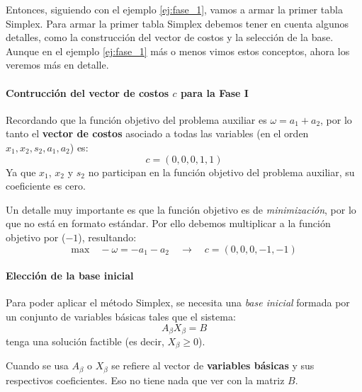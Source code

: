 Entonces, siguiendo con el ejemplo \ref{ej:fase_1}, vamos a armar la primer tabla Simplex. Para armar la primer tabla Simplex debemos tener en cuenta algunos detalles, como la construcción del vector de costos y la selección de la base. Aunque en el ejemplo \ref{ej:fase_1} más o menos vimos estos conceptos, ahora los veremos más en detalle.

\paragraph{Contrucción del vector de costos \(c\) para la Fase I}

Recordando que la función objetivo del problema auxiliar es \(\omega = a_1 + a_2\), por lo tanto el \textbf{vector de costos} asociado a todas las variables (en el orden \(x_1, x_2, s_2, a_1, a_2\)) es: 
\[c = (0, 0, 0, 1, 1)\]
Ya que \(x_1\), \(x_2\) y \(s_2\) no participan en la función objetivo del problema auxiliar, su coeficiente es cero.

Un detalle muy importante es que la función objetivo es de \textit{minimización}, por lo que no está en formato estándar. Por ello debemos multiplicar a la función objetivo por (\(-1\)), resultando:
\[
  \text{max} \quad -\omega = - a_1 - a_2 \quad \rightarrow \quad c=(0,0,0,-1,-1)
\]

\paragraph{Elección de la base inicial}

Para poder aplicar el método Simplex, se necesita una \textit{base inicial} formada por un conjunto de variables básicas tales que el sistema:
\[
A_{\beta}X_{\beta} = B
\]
tenga una solución factible (es decir, \(X_\beta \geq 0\)).
\begin{tcolorbox}[remember, title=Aclaración]
  Cuando se usa \(A_\beta\) o \(X_\beta\) se refiere al vector de \textbf{variables básicas} y sus respectivos coeficientes. Eso no tiene nada que ver con la matriz \(B\).
\end{tcolorbox}

